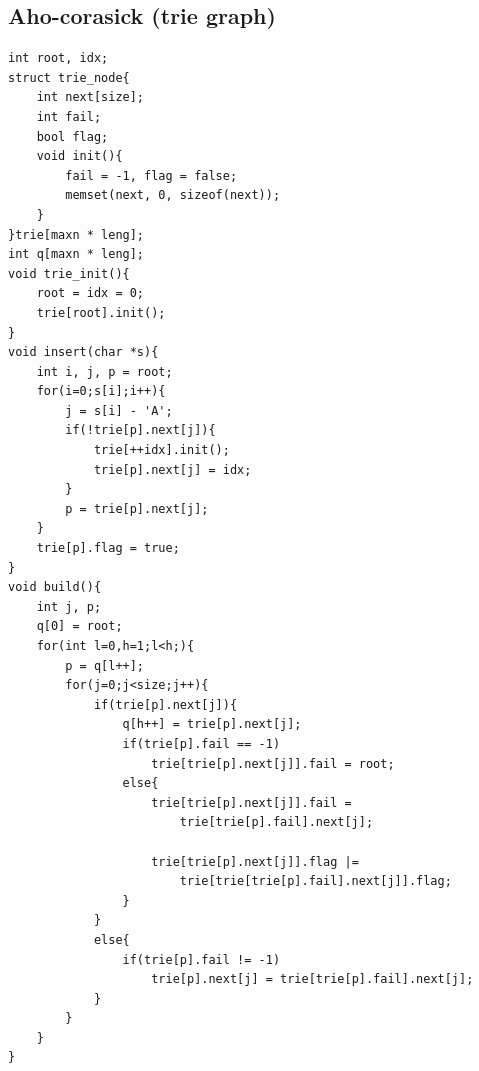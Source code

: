 \documentclass[twocolumn]{article}
\begin{document}
\begin{twocolumn}
\subsection{Aho-corasick (trie graph)}
\begin{lstlisting}[language={[ANSI]C}]
int root, idx;
struct trie_node{
    int next[size];
    int fail;
    bool flag;
    void init(){
        fail = -1, flag = false;
        memset(next, 0, sizeof(next));
    }
}trie[maxn * leng];
int q[maxn * leng];
void trie_init(){
    root = idx = 0;
    trie[root].init();
}
void insert(char *s){
    int i, j, p = root;
    for(i=0;s[i];i++){
        j = s[i] - 'A';
        if(!trie[p].next[j]){
            trie[++idx].init();
            trie[p].next[j] = idx;
        }
        p = trie[p].next[j];
    }
    trie[p].flag = true;
}
void build(){
    int j, p;
    q[0] = root;
    for(int l=0,h=1;l<h;){
        p = q[l++];
        for(j=0;j<size;j++){
            if(trie[p].next[j]){
                q[h++] = trie[p].next[j];
                if(trie[p].fail == -1)
                    trie[trie[p].next[j]].fail = root;
                else{
                    trie[trie[p].next[j]].fail =
                        trie[trie[p].fail].next[j];

                    trie[trie[p].next[j]].flag |=
                        trie[trie[trie[p].fail].next[j]].flag;
                }
            }
            else{
                if(trie[p].fail != -1)
                    trie[p].next[j] = trie[trie[p].fail].next[j];
            }
        }
    }
}
\end{lstlisting}
\begin{lstlisting}[language={[ANSI]C}]
\end{lstlisting}
\begin{lstlisting}[language={[ANSI]C}]
\end{lstlisting}


\end{twocolumn}
\end{document}
